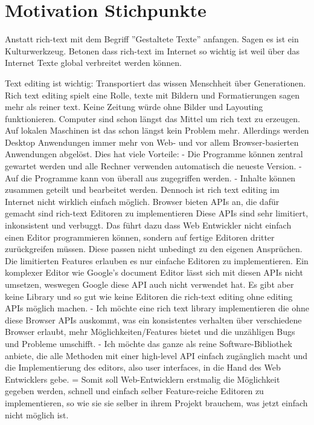 

\section{Motivation Stichpunkte}

Anstatt rich-text mit dem Begriff ''Gestaltete Texte'' anfangen. Sagen es ist ein Kulturwerkzeug. Betonen dass  rich-text im Internet so wichtig ist weil über das Internet Texte global verbreitet werden können.

Text editing ist wichtig: Transportiert das wissen Menschheit über Generationen.
Rich text editing spielt eine Rolle, texte mit Bildern und Formatierungen sagen mehr als reiner text. Keine Zeitung würde ohne Bilder und Layouting funktionieren.
Computer sind schon längst das Mittel um rich text zu erzeugen.
Auf lokalen Maschinen ist das schon längst kein Problem mehr.
Allerdings werden Desktop Anwendungen immer mehr von Web- und vor allem Browser-basierten Anwendungen abgelöst.
Dies hat viele Vorteile:
 - Die Programme können zentral gewartet werden und alle Rechner verwenden automatisch die neueste Version.
 - Auf die Programme kann von überall aus zugegriffen werden.
 - Inhalte können zusammen geteilt und bearbeitet werden.
Dennoch ist rich text editing im Internet nicht wirklich einfach möglich.
Browser bieten APIs an, die dafür gemacht sind rich-text Editoren zu implementieren
Diese APIs sind sehr limitiert, inkonsistent und verbuggt.
Das führt dazu dass Web Entwickler nicht einfach einen Editor programmieren können, sondern auf fertige Editoren dritter zurückgreifen müssen. Diese passen nicht unbedingt zu den eigenen Ansprüchen.
Die limitierten Features erlauben es nur einfache Editoren zu implementieren. Ein komplexer Editor wie Google's document Editor lässt sich mit diesen APIs nicht umsetzen, weswegen Google diese API auch nicht verwendet hat. 
Es gibt aber keine Library und so gut wie keine Editoren die rich-text editing ohne editing APIs möglich machen.
 - Ich möchte eine rich text library implementieren die ohne diese Browser APIs auskommt, was ein konsistentes verhalten über verschiedene Browser erlaubt, mehr Möglichkeiten/Features bietet und die unzähligen Bugs und Probleme umschifft.
 - Ich möchte das ganze als reine Software-Bibliothek anbiete, die alle Methoden mit einer high-level API einfach zugänglich macht und die Implementierung des editors, also user interfaces, in die Hand des Web Entwicklers gebe.
= Somit soll Web-Entwicklern erstmalig die Möglichkeit gegeben werden, schnell und einfach selber Feature-reiche Editoren zu implementieren, so wie sie sie selber in ihrem Projekt brauchem, was jetzt einfach nicht möglich ist.


